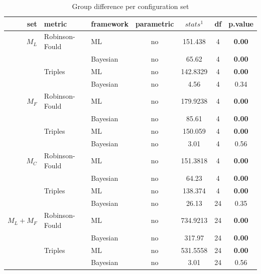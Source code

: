 \documentclass[12pt,letterpaper]{article}
\begin{document}
\begin{table}
\caption{Group difference per configuration set}
\centering
\begin{tabular}{rllcccc}
    \hline
    set & metric & framework & parametric & $stats^1$ & df & p.value \\
    \hline
    $M_L$         & Robinson-Fould & ML       & no & 151.438  & 4   & \textbf{0.00} \\ %
                  &                & Bayesian & no & 65.62    & 4   & \textbf{0.00} \\ 
                  & Triples        & ML       & no & 142.8329 & 4   & \textbf{0.00} \\ %
                  &                & Bayesian & no & 4.56     & 4   & 0.34          \\ 
    $M_F$         & Robinson-Fould & ML       & no & 179.9238 & 4   & \textbf{0.00} \\ %
                  &                & Bayesian & no & 85.61    & 4   & \textbf{0.00} \\
                  & Triples        & ML       & no & 150.059  & 4   & \textbf{0.00} \\ %
                  &                & Bayesian & no & 3.01     & 4   & 0.56          \\
    $M_C$         & Robinson-Fould & ML       & no & 151.3818 & 4   & \textbf{0.00} \\ %
                  &                & Bayesian & no & 64.23    & 4   & \textbf{0.00} \\
                  & Triples        & ML       & no & 138.374  & 4   & \textbf{0.00} \\ %
                  &                & Bayesian & no & 26.13    & 24  & 0.35          \\
    $M_L+M_F$     & Robinson-Fould & ML       & no & 734.9213 & 24  & \textbf{0.00} \\ %
                  &                & Bayesian & no & 317.97   & 24  & \textbf{0.00} \\
                  & Triples        & ML       & no & 531.5558 & 24  & \textbf{0.00} \\ %
                  &                & Bayesian & no & 3.01     & 24  & 0.56          \\

\end{tabular}
\end{table}
\end{document}
